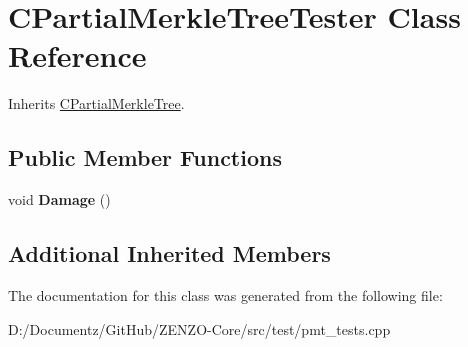 \hypertarget{class_c_partial_merkle_tree_tester}{}\section{C\+Partial\+Merkle\+Tree\+Tester Class Reference}
\label{class_c_partial_merkle_tree_tester}


Inherits \mbox{\hyperlink{class_c_partial_merkle_tree}{C\+Partial\+Merkle\+Tree}}.

\subsection*{Public Member Functions}
\begin{DoxyCompactItemize}
\item 
\mbox{\label{class_c_partial_merkle_tree_tester_a16ba9afcb58236df8fdf58cd545a4110}} 
void {\bfseries Damage} ()
\end{DoxyCompactItemize}
\subsection*{Additional Inherited Members}


The documentation for this class was generated from the following file\+:\begin{DoxyCompactItemize}
\item 
D\+:/\+Documentz/\+Git\+Hub/\+Z\+E\+N\+Z\+O-\/\+Core/src/test/pmt\+\_\+tests.\+cpp\end{DoxyCompactItemize}
